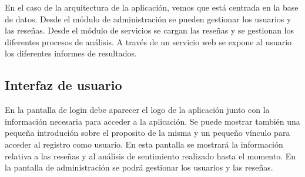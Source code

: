 En el caso de la arquitectura de la aplicación, vemos que está centrada en la base de datos.
Desde el módulo de administración se pueden gestionar los usuarios y las reseñas.
Desde el módulo de servicios se cargan las reseñas y se gestionan los diferentes procesos de análisis.
A través de un servicio web se expone al usuario los diferentes informes de resultados.


\subsection{Interfaz de usuario}
En la pantalla de login debe aparecer el logo de la aplicación 
junto con la información necesaria para acceder a la aplicación.
Se puede mostrar también una pequeña introdución sobre el proposito de la misma y 
un pequeño vínculo para acceder al registro como usuario.
En esta pantalla se mostrará la información relativa a las reseñas y 
al análisis de sentimiento realizado hasta el momento.
En la pantalla de administración se podrá gestionar los usuarios y las reseñas.
